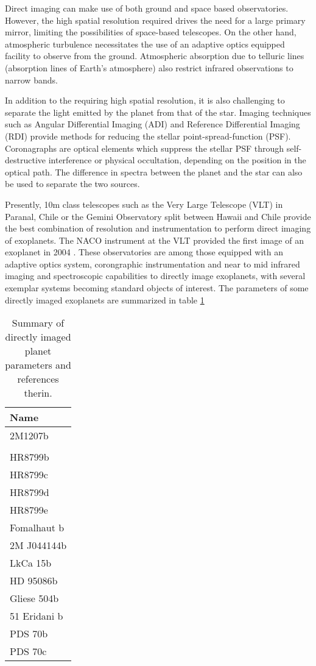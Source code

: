 Direct imaging can make use of both ground and space based observatories. 
However, the high spatial resolution required drives the need for a large primary mirror, limiting the possibilities of space-based telescopes. On the other hand, atmospheric turbulence necessitates the use of an adaptive optics equipped facility to observe from the ground. 
Atmospheric absorption due to telluric lines (absorption lines of Earth's atmosphere) also restrict infrared observations to narrow bands.

In addition to the requiring high spatial resolution, it is also challenging to separate the light emitted by the planet from that of the star.
Imaging techniques such as Angular Differential Imaging (ADI) \autocite{Marois2007} and Reference Differential Imaging (RDI) \autocite{Lefreniere2009,Soummer2012} provide methods for reducing the stellar point-spread-function (PSF). 
Coronagraphs are optical elements which suppress the stellar PSF through self-destructive interference or physical occultation, depending on the position in the optical path.
The difference in spectra between the planet and the star can also be used to separate the two sources.
 
Presently, 10m class telescopes such as the Very Large Telescope (VLT) in Paranal, Chile or the Gemini Observatory split between Hawaii and Chile provide the best combination of resolution and instrumentation to perform direct imaging of exoplanets.
The NACO instrument at the VLT provided the first image of an exoplanet in 2004 \autocite{Chauvin2004}.
These observatories are among those equipped with an adaptive optics system, corongraphic instrumentation and near to mid infrared imaging and spectroscopic capabilities to directly image exoplanets, with several exemplar systems becoming standard objects of interest. 
The parameters of some directly imaged exoplanets are summarized in table \ref{tab:exoplanetparams}
\begin{table}[t]
	\begin{tabular}{l}
		\toprule
		\textbf{Name} \\
		\midrule
		2M1207b\\
		\bpic\\
		HR8799b\\
		HR8799c\\
		HR8799d\\
		HR8799e\\
		Fomalhaut b\\
		2M J044144b\\
		LkCa 15b\\
		HD 95086b\\
		Gliese 504b\\
		51 Eridani b\\
		PDS 70b\\
		PDS 70c\\
		\bottomrule
	\end{tabular}
	\caption{Summary of directly imaged planet parameters \cite{Bowler2016} and references therin.}
	\label{tab:exoplanetparams}
\end{table}


